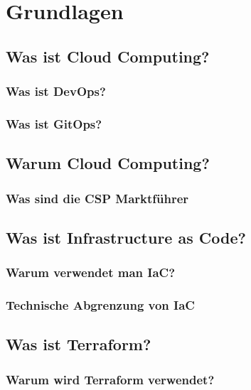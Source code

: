 
\chapter{Grundlagen}
\label{sec:grundl}

\section{Was ist Cloud Computing?}

\subsection{Was ist DevOps?}

\subsection{Was ist GitOps?}

\section{Warum Cloud Computing?}

\subsection{Was sind die CSP Marktführer}

\section{Was ist Infrastructure as Code?}

\subsection{Warum verwendet man IaC?}

\subsection{Technische Abgrenzung von IaC}

\section{Was ist Terraform?}

\subsection{Warum wird Terraform verwendet?}

